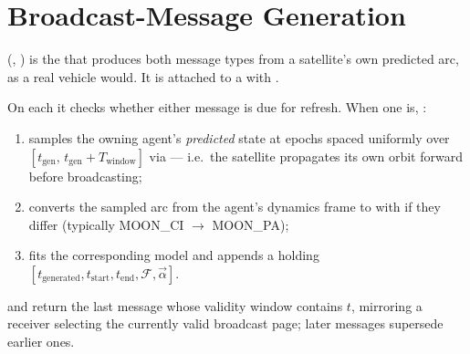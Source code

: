 \section{Broadcast-Message Generation}
\label{sec:eph-broadcast}

(,
) is the  that produces both
message types from a satellite's own predicted arc, as a real vehicle would.
It is attached to a  with .

On each  it checks whether either message is due for refresh. When
one is, :
\begin{enumerate}[leftmargin=1.6em]
  \item samples the owning agent's \emph{predicted} state at
     epochs spaced uniformly over
    $[t_\mathrm{gen},\, t_\mathrm{gen} + T_\mathrm{window}]$ via
     --- i.e.\ the satellite propagates its own orbit
    forward before broadcasting;
  \item converts the sampled arc from the agent's dynamics frame to
     with  if they differ (typically
    MOON\_CI $\to$ MOON\_PA);
  \item fits the corresponding model and appends a 
    holding $[t_\mathrm{generated}, t_\mathrm{start}, t_\mathrm{end},
    \mathcal{F}, \vec{\alpha}]$.
\end{enumerate}
 and  return the last message
whose validity window contains $t$, mirroring a receiver selecting the
currently valid broadcast page; later messages supersede earlier ones.

